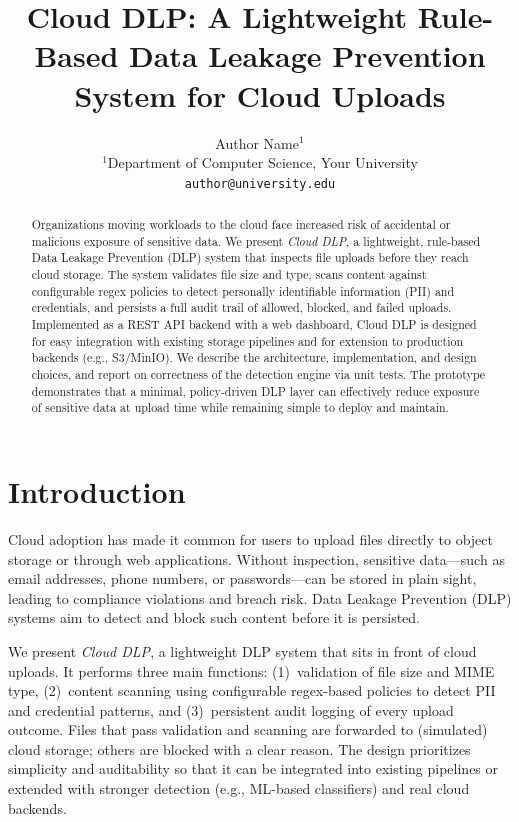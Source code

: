 \documentclass[11pt,a4paper]{article}
\title{\textbf{Cloud DLP: A Lightweight Rule-Based Data Leakage Prevention System for Cloud Uploads}}
\author{
  Author Name$^{1}$ \\
  $^{1}$Department of Computer Science, Your University \\
  \texttt{author@university.edu}
}
\date{}
\begin{document}
\maketitle

\begin{abstract}
Organizations moving workloads to the cloud face increased risk of accidental or malicious exposure of sensitive data. We present \emph{Cloud DLP}, a lightweight, rule-based Data Leakage Prevention (DLP) system that inspects file uploads before they reach cloud storage. The system validates file size and type, scans content against configurable regex policies to detect personally identifiable information (PII) and credentials, and persists a full audit trail of allowed, blocked, and failed uploads. Implemented as a REST API backend with a web dashboard, Cloud DLP is designed for easy integration with existing storage pipelines and for extension to production backends (e.g., S3/MinIO). We describe the architecture, implementation, and design choices, and report on correctness of the detection engine via unit tests. The prototype demonstrates that a minimal, policy-driven DLP layer can effectively reduce exposure of sensitive data at upload time while remaining simple to deploy and maintain.
\end{abstract}

\section{Introduction}
\label{sec:intro}

Cloud adoption has made it common for users to upload files directly to object storage or through web applications. Without inspection, sensitive data---such as email addresses, phone numbers, or passwords---can be stored in plain sight, leading to compliance violations and breach risk. Data Leakage Prevention (DLP) systems aim to detect and block such content before it is persisted.

We present \emph{Cloud DLP}, a lightweight DLP system that sits in front of cloud uploads. It performs three main functions: (1)~validation of file size and MIME type, (2)~content scanning using configurable regex-based policies to detect PII and credential patterns, and (3)~persistent audit logging of every upload outcome. Files that pass validation and scanning are forwarded to (simulated) cloud storage; others are blocked with a clear reason. The design prioritizes simplicity and auditability so that it can be integrated into existing pipelines or extended with stronger detection (e.g., ML-based classifiers) and real cloud backends.
\end{document}
